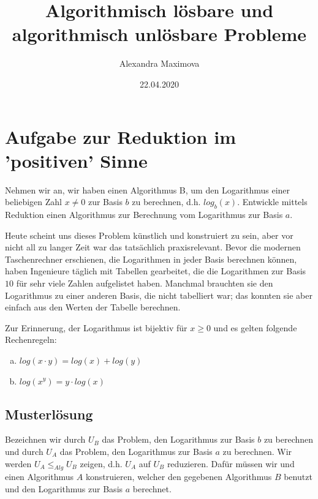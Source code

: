 \documentclass[
	12pt, %
	german, %
]{fphw}
\title{Algorithmisch lösbare und algorithmisch unlösbare Probleme} %
\author{Alexandra Maximova} %
\date{22.04.2020} %
\institute{ETH Zurich \\ Lehrdiplom Informatik} %
\begin{document}
\maketitle %


\section*{Aufgabe zur Reduktion im 'positiven' Sinne}

\begin{problem}
	Nehmen wir an, wir haben einen Algorithmus B, um den Logarithmus einer beliebigen Zahl \(x \neq 0\) zur Basis \(b\) zu berechnen, d.h. \(log_b(x)\). Entwickle mittels Reduktion einen Algorithmus zur Berechnung vom Logarithmus zur Basis \(a\).
	
	Heute scheint uns dieses Problem künstlich und konstruiert zu sein, aber vor nicht all zu langer Zeit war das tatsächlich praxisrelevant. Bevor die modernen Taschenrechner erschienen, die Logarithmen in jeder Basis berechnen können, haben Ingenieure täglich mit Tabellen gearbeitet, die die Logarithmen zur Basis \(10\) für sehr viele Zahlen aufgelistet haben. Manchmal brauchten sie den Logarithmus zu einer anderen Basis, die nicht tabelliert war; das konnten sie aber einfach aus den Werten der Tabelle berechnen.
	
	Zur Erinnerung, der Logarithmus ist bijektiv für \(x \geq 0\) und es gelten folgende Rechenregeln:
	\begin{enumerate}[(a)]
		\item \( log(x \cdot y) = log(x) + log(y) \)
		\item \( log(x^y) = y \cdot log(x) \)
	\end{enumerate}
\end{problem}



\subsection*{Musterlösung}

Bezeichnen wir durch \(U_B\) das Problem, den Logarithmus zur Basis \(b\) zu berechnen und durch \(U_A\) das Problem, den Logarithmus zur Basis \(a\) zu berechnen. Wir werden \(U_A \leq_{Alg} U_B\) zeigen, d.h. \(U_A\) auf \(U_B\) reduzieren. Dafür müssen wir und einen Algorithmus \(A\) konstruieren, welcher den gegebenen Algorithmus \(B\) benutzt und den Logarithmus zur Basis \(a\) berechnet.
\end{document}
